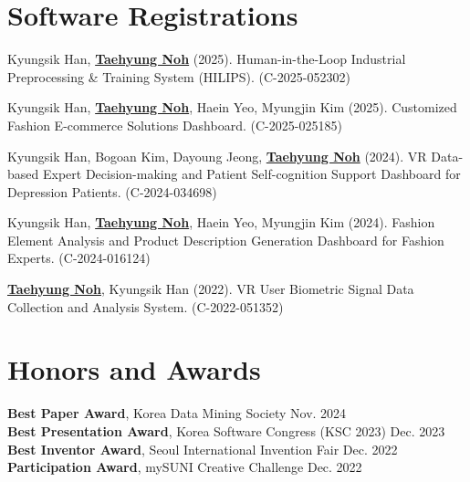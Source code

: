 \documentclass[a4paper,11pt]{article}
\begin{document}
\section{\textbf{Software Registrations}}
\vspace{0.2mm}
\small{
\begin{enumerate}[leftmargin=*, labelsep=0.5em, align=left, widest={[\textbf{SW.1}]}, itemindent=0em, label={\textbf{[SW.\arabic*]}}]

\item Kyungsik Han, \underline{\textbf{Taehyung Noh}} (2025). Human-in-the-Loop Industrial Preprocessing \& Training System (HILIPS). (C-2025-052302)

\item Kyungsik Han, \underline{\textbf{Taehyung Noh}}, Haein Yeo, Myungjin Kim (2025). Customized Fashion E-commerce Solutions Dashboard. (C-2025-025185)

\item Kyungsik Han, Bogoan Kim, Dayoung Jeong, \underline{\textbf{Taehyung Noh}} (2024). VR Data-based Expert Decision-making and Patient Self-cognition Support Dashboard for Depression Patients. (C-2024-034698)

\item Kyungsik Han, \underline{\textbf{Taehyung Noh}}, Haein Yeo, Myungjin Kim (2024). Fashion Element Analysis and Product Description Generation Dashboard for Fashion Experts. (C-2024-016124)

\item \underline{\textbf{Taehyung Noh}}, Kyungsik Han (2022). VR User Biometric Signal Data Collection and Analysis System. (C-2022-051352)

\end{enumerate}
}

\section{\textbf{Honors and Awards}}
\textbf{Best Paper Award}, Korea Data Mining Society \hfill Nov. 2024 \\
\textbf{Best Presentation Award}, Korea Software Congress (KSC 2023) \hfill Dec. 2023 \\
\textbf{Best Inventor Award}, Seoul International Invention Fair \hfill Dec. 2022 \\
\textbf{Participation Award}, mySUNI Creative Challenge  \hfill Dec. 2022 \\
\end{document}
